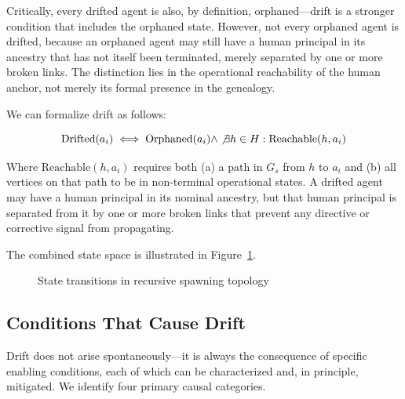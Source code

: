 Critically, every drifted agent is also, by definition, orphaned—drift is a stronger condition that includes the orphaned state. However, not every orphaned agent is drifted, because an orphaned agent may still have a human principal in its ancestry that has not itself been terminated, merely separated by one or more broken links. The distinction lies in the operational reachability of the human anchor, not merely its formal presence in the genealogy.

We can formalize drift as follows:

\[
\text{Drifted}(a_i) \iff \text{Orphaned}(a_i) \land \not\exists h \in H : \text{Reachable}(h, a_i)
\]

Where $\text{Reachable}(h, a_i)$ requires both (a) a path in $G_s$ from $h$ to $a_i$ and (b) all vertices on that path to be in non-terminal operational states. A drifted agent may have a human principal in its nominal ancestry, but that human principal is separated from it by one or more broken links that prevent any directive or corrective signal from propagating.

The combined state space is illustrated in Figure~\ref{fig:agent_states}.

\begin{figure}[ht]
\centering
{}
\caption{State transitions in recursive spawning topology}
\label{fig:agent_states}
\end{figure}

\subsection{Conditions That Cause Drift}

Drift does not arise spontaneously—it is always the consequence of specific enabling conditions, each of which can be characterized and, in principle, mitigated. We identify four primary causal categories.

